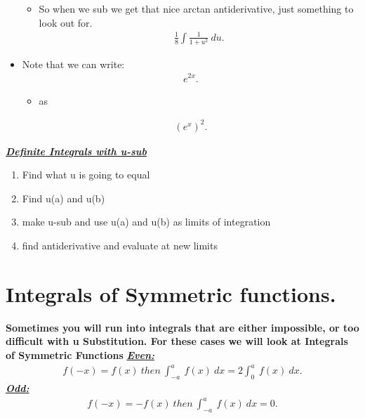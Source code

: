 \documentclass{report}
\begin{document}
\begin{itemize}
\begin{itemize}
          \item So when we sub we get that nice arctan antiderivative, just something to look out for.
            \begin{align*}
              \frac{1}{8}\int \frac{1}{1+u^{2}}\ du
            .\end{align*}
            \end{itemize}
          \item Note that we can write:
            \begin{align*}
              e^{2x}
            .\end{align*}
            \begin{itemize}
              \item as 
            \end{itemize}
            \begin{align*}
              (e^{x})^{2}
            .\end{align*}
      \end{itemize}

      \bigbreak \noindent \bigbreak \noindent
       \textbf{\textit{\underline{Definite Integrals with u-sub}}} 
      \begin{enumerate}
        \item Find what u is going to equal
        \item Find u(a) and u(b) 
        \item make u-sub and use u(a) and u(b) as limits of integration
        \item find antiderivative and evaluate at new limits
      \end{enumerate}
      \bigbreak \noindent 

      \pagebreak \bigbreak \noindent
      \section{Integrals of Symmetric functions.}
      \bigbreak \noindent \bigbreak \noindent
      \textbf{Sometimes you will run into integrals that are either impossible, or too difficult with u Substitution. For these cases we will look at Integrals of Symmetric Functions}
      \bigbreak \noindent \bigbreak \noindent
      \textbf{\textit{\underline{Even:}}} 
      \begin{align*}
        f(-x)  = f(x)\ then\ \int_{-a}^{a}\ f(x)\ dx  = 2 \int_{0}^{a}\ f(x)\ dx
      .\end{align*}
      \bigbreak \noindent \bigbreak \noindent
      \textbf{\textit{\underline{Odd:}}}
      \begin{align*}
        f(-x) = -f(x)\ then\ \int_{-a}^{a}\ f(x)\ dx = 0
      .\end{align*}
\end{document}
